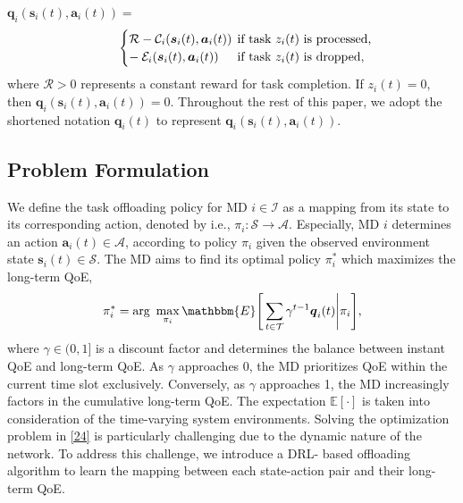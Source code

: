 \documentclass[10pt, journal,letterpaper]{IEEEtran}
\begin{document}
$\boldsymbol{q}_i(\boldsymbol{s}_i(t),\boldsymbol{a}_i(t)) =$
\begin{alignat}{1}
	\hspace*{8mm}
	\begin{cases} 
		\mathcal{R} - \mathcal{C}_i(\boldsymbol{s}_i(t),\boldsymbol{a}_i(t)) & \hspace*{-2mm} \text{if task $z_i(t)$ is processed,} \\
		- \hspace*{0.8mm} \mathcal{E}_i(\boldsymbol{s}_i(t),\boldsymbol{a}_i(t)) &	\hspace*{-2mm} \text{if task $z_i(t)$ is dropped,}
	\end{cases}
	\label{26}  
\end{alignat}
where $\mathcal{R} > 0$ represents a constant reward for task completion. If $z_i(t) = 0$, then $\boldsymbol{q}_i(\boldsymbol{s}_i(t), \boldsymbol{a}_i(t)) = 0$. Throughout the rest of this paper, we adopt the shortened notation $\boldsymbol{q}_i(t)$ to represent $\boldsymbol{q}_i(\boldsymbol{s}_i(t), \boldsymbol{a}_i(t))$.

\subsection{Problem Formulation}
We define the task offloading policy for MD $i \in \mathcal{I}$ as a mapping from its state to its corresponding action, denoted by i.e., $\pi_i : \mathcal{S} \rightarrow \mathcal{A}$. Especially, MD $i$ determines an action $\boldsymbol{a}_i(t) \in \mathcal{A}$, according to policy $\pi_i$ given the observed environment state $\boldsymbol{s}_i(t) \in \mathcal{S}$. The MD aims to find its optimal policy $\pi_i^*$ which maximizes the long-term QoE,
\begin{alignat}{1}
	\pi_i^* = \text{arg}\,\,  \max\limits_{\pi_i}  \mathbbm{E} \Bigg[ \sum\limits_{t \in \mathcal{T}}  \gamma^{t-1}\boldsymbol{q}_i(t) \Bigg| \pi_i \Bigg],
	\label{24}  
\end{alignat}
where $\gamma \in (0,1]$ is a discount factor and determines the balance between instant QoE and long-term QoE. As $\gamma$ approaches 0, the MD prioritizes QoE within the current time slot exclusively. Conversely, as $\gamma$ approaches 1, the MD increasingly factors in the cumulative long-term QoE. The expectation $\mathbb{E}[\cdot]$ is taken into consideration of the time-varying system environments. Solving the optimization problem in \eqref{24} is particularly challenging due to the dynamic nature of the network. To address this challenge, we introduce a DRL- based offloading algorithm to learn the mapping between each state-action pair and their long-term QoE.
\end{document}
